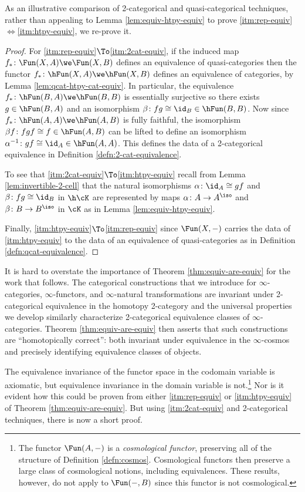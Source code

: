   As an illustrative comparison of 2-categorical and quasi-categorical techniques, rather than appealing to Lemma \ref{lem:equiv-htpy-equiv} to prove \ref{itm:rep-equiv}$\Leftrightarrow$\ref{itm:htpy-equiv}, we re-prove it.
  \begin{proof}
    For \ref{itm:rep-equiv}$\To$\ref{itm:2cat-equiv}, if the induced map $f_* \colon \Fun(X,A) \we \Fun(X,B)$  defines an equivalence of quasi-categories then the functor $f_* \colon \hFun(X,A) \we \hFun(X,B)$ defines an equivalence of categories, by Lemma \ref{lem:qcat-htpy-cat-equiv}. In particular, the equivalence $f_* \colon \hFun(B,A) \we \hFun(B,B)$ is essentially surjective so there exists $g \in \hFun(B,A)$ and an isomorphism $\beta \colon fg \cong \id_B \in \hFun(B,B)$. Now since $f_* \colon \hFun(A,A) \we \hFun(A,B)$ is fully faithful, the isomorphism $\beta f \colon fgf \cong f \in \hFun(A,B)$ can be lifted to define an isomorphism $\alpha^{-1} \colon gf \cong \id_A \in \hFun(A,A)$. This defines the data of a 2-categorical equivalence in Definition \ref{defn:2-cat-equivalence}.

  To see that \ref{itm:2cat-equiv}$\To$\ref{itm:htpy-equiv} recall from Lemma \ref{lem:invertible-2-cell} that the natural isomorphisms $\alpha \colon \id_A \cong gf$ and $\beta \colon fg \cong \id_B$ in $\h\cK$ are represented by maps $\alpha \colon A \to A^\iso$ and $\beta \colon B \to B^\iso$ in $\cK$ as in Lemma \ref{lem:equiv-htpy-equiv}.

  Finally, \ref{itm:htpy-equiv}$\To$\ref{itm:rep-equiv} since $\Fun(X,-)$ carries the data of \ref{itm:htpy-equiv} to the data of an equivalence of quasi-categories as in  Definition \ref{defn:qcat-equivalence}.
  \end{proof}

  It is hard to overstate the importance of Theorem \ref{thm:equiv-are-equiv} for the work that follows. The categorical constructions that we introduce for $\infty$-categories, $\infty$-func\-tors, and $\infty$-natural transformations are invariant under 2-cat\-e\-go\-ri\-cal equivalence in the homotopy 2-category and the universal properties we develop similarly characterize 2-categorical equivalence classes of $\infty$-cat\-e\-go\-ries. Theorem \ref{thm:equiv-are-equiv} then asserts that such constructions are ``homotopically correct'': both invariant under equivalence in the $\infty$-cosmos and precisely identifying equivalence classes of objects.


  The equivalence invariance of the functor space in the codomain variable is axiomatic, but equivalence invariance in the domain variable is not.\footnote{The functor $\Fun(A,-)$ is a \emph{cosmological functor}, preserving all of the structure of Definition \ref{defn:cosmos}. Cosmological functors then preserve a large class of cosmological notions, including equivalences. These results, however, %
  do not apply to $\Fun(-,B)$ since this functor is not cosmological.} Nor is it evident how this could be proven from either \ref{itm:rep-equiv} or \ref{itm:htpy-equiv} of Theorem \ref{thm:equiv-are-equiv}. But using \ref{itm:2cat-equiv} and 2-categorical techniques, there is now a short proof.

